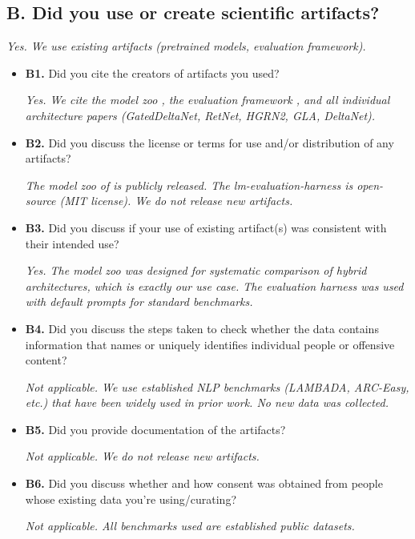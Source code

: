 \subsection*{B. Did you use or create scientific artifacts?}

\textit{Yes. We use existing artifacts (pretrained models, evaluation framework).}

\begin{itemize}
\item[\checkmark] \textbf{B1.} Did you cite the creators of artifacts you used?

\textit{Yes. We cite the model zoo \citep{wang2025hybrid}, the evaluation framework \citep{gao2024lmeval}, and all individual architecture papers (GatedDeltaNet, RetNet, HGRN2, GLA, DeltaNet).}

\item[\checkmark] \textbf{B2.} Did you discuss the license or terms for use and/or distribution of any artifacts?

\textit{The model zoo of \citet{wang2025hybrid} is publicly released. The lm-evaluation-harness \citep{gao2024lmeval} is open-source (MIT license). We do not release new artifacts.}

\item[\checkmark] \textbf{B3.} Did you discuss if your use of existing artifact(s) was consistent with their intended use?

\textit{Yes. The model zoo was designed for systematic comparison of hybrid architectures, which is exactly our use case. The evaluation harness was used with default prompts for standard benchmarks.}

\item[N/A] \textbf{B4.} Did you discuss the steps taken to check whether the data contains information that names or uniquely identifies individual people or offensive content?

\textit{Not applicable. We use established NLP benchmarks (LAMBADA, ARC-Easy, etc.) that have been widely used in prior work. No new data was collected.}

\item[N/A] \textbf{B5.} Did you provide documentation of the artifacts?

\textit{Not applicable. We do not release new artifacts.}

\item[N/A] \textbf{B6.} Did you discuss whether and how consent was obtained from people whose existing data you're using/curating?

\textit{Not applicable. All benchmarks used are established public datasets.}
\end{itemize}

